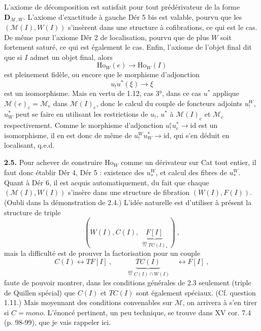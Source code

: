 \documentclass[11pt]{article}
\newcommand{\printedpage}[1]{\marginpar{\footnotesize p.~#1}}
\newcommand{\msp}[1]{\marginpar{\footnotesize [#1]}}
\newcommand{\deq}{\overset{\text{déf}}{=}}
\newcommand{\Ho}{\mathrm{Ho}}
\begin{document}
\printedpage{14}

\msp{page 23}
L'axiome de décomposition est satisfait pour tout prédérivateur de la forme $\mathbf{D}_{\mathcal{M},W}$. L'axiome d'exactitude à gauche Dér 5 bis est valable, pourvu que les $(\mathcal{M}(I),W(I))$ s'insèrent dans une structure à cofibrations, ce qui est le cas. De même pour l'axiome Dér 2 de localisation, pourvu que de plus $W$ soit fortement saturé, ce qui est également le cas. Enfin, l'axiome de l'objet final dit que si $I$ admet un objet final, alors
\[ \Ho_W(e) \longrightarrow \Ho_W(I) \]
est pleinement fidèle, ou encore que le morphisme d'adjonction
\[ u_!u^*(\xi) \longrightarrow \xi \]
est un isomorphisme. Mais en vertu de 1.12, cas 3°, dans ce cas $u^*$ applique $\mathcal{M}(e)_{\mathrm{c}} = \mathcal{M}_{\mathrm{c}}$ dans $\mathcal{M}(I)_{\mathrm{c}}$, donc le calcul du couple de foncteurs adjoints $u_!^W$, $u_W^*$ peut se faire en utilisant les restrictions de $u_!$, $u^*$ à $\mathcal{M}(I)_{\mathrm{c}}$ et $\mathcal{M}_{\mathrm{c}}$ respectivement. Comme le morphisme d'adjonction $u_!^{\mathrm{c}}u_{\mathrm{c}}^* \longrightarrow \mathrm{id}$ est un isomorphisme, il en est donc de même de $u_!^W u_W^* \longrightarrow \mathrm{id}$, qui s'en déduit en localisant, q.e.d.

\textbf{2.5.} Pour achever de construire $\Ho_W$ comme un dérivateur sur Cat tout entier, il faut \msp{page 24} donc établir Dér 4, Dér 5 : existence des $u_*^W$, et calcul des fibres de $u_*^W$. Quant à Dér 6, il est acquis automatiquement, du fait que chaque $(\mathcal{M}(I),W(I))$ s'insère dans une structure de fibration $(W(I),F(I))$. (Oubli dans la démonstration de 2.4.) L'idée naturelle est d'utiliser à présent la structure de triple
\[ (W(I),C(I),\ \underbrace{F[I]}_{\deq TC(I)_*}\ )\ , \tag*{(2.5.1)} \]
mais la difficulté est de prouver la factorisation pour un couple
\[ C(I) \longleftrightarrow TF[I]\ , \qquad \underbrace{TC(I)}_{\deq C(I)\cap W(I)} \quad \longleftrightarrow F[I]\ , \tag*{(2.5.2)} \]
faute de pouvoir montrer, dans les conditions générales de 2.3 seulement (triple de Quillen spécial) que $C(I)$ et $TC(I)$ sont également spéciaux. (Cf. question 1.11.) Mais moyennant des conditions convenables sur $\mathcal{M}$, on arrivera à s'en tirer si $C = \mathit{mono}$. L'énoncé pertinent, un peu technique, se trouve dans XV cor. 7.4 (p. 98-99), que je vais rappeler ici.

\printedpage{15}
\end{document}
